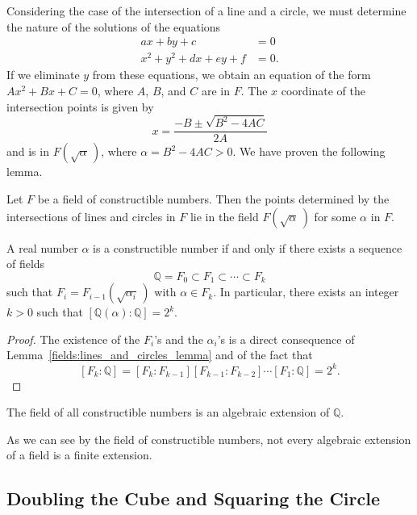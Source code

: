 Considering the case of the intersection of a line and a circle, we
must determine the nature of the solutions of the equations
\begin{align*}
a x + by + c & = 0 \\
x^2 + y^2 + d x + e y + f & = 0.
\end{align*}
If we eliminate $y$ from these equations, we obtain an equation of
the form $Ax^2 + B x + C = 0$, where $A$, $B$, and $C$ are in $F$. The
$x$ coordinate of the intersection points is given by
\[
x = \frac{- B \pm \sqrt{B^2 - 4 A C} }{2 A}
\]
and is in $F( \sqrt{\alpha}\, )$, where $\alpha = B^2 - 4 A C > 0$.
We have proven the following lemma.

 
\begin{lemma}\label{fields:lines_and_circles_lemma}
Let $F$ be a field of constructible numbers. Then the points
determined by the intersections of lines and circles in $F$ lie in the
field $F( \sqrt{\alpha}\, )$ for some $\alpha$ in $F$.  
\end{lemma}
 
 
\begin{theorem}
A real number $\alpha$ is a constructible number if and only if there
exists a  sequence of fields
\[
{\mathbb Q} = F_0 \subset F_1 \subset \cdots \subset F_k
\]
such that $F_i = F_{i-1}( \sqrt{ \alpha_i}\, )$ with $\alpha \in F_k$. 
In particular, there exists an integer $k > 0$ such that 
$[{\mathbb Q}(\alpha) : {\mathbb Q} ] = 2^k$.
\end{theorem}
 
 
\begin{proof}
The existence of the $F_i$'s and the $\alpha_i$'s is a direct
consequence of Lemma~\ref{fields:lines_and_circles_lemma} and of the fact that
\[
[F_k: {\mathbb Q}] = [F_k : F_{k-1}][F_{k-1} : F_{k-2}] \cdots [F_1:
{\mathbb Q} ] = 2^k.
\]
\end{proof}


\begin{corollary}
The field of all constructible numbers is an algebraic extension of
${\mathbb Q}$.
\end{corollary}
 

As we can see by the field of constructible numbers, not every
algebraic extension of a field is a finite extension. 
 


\subsection*{Doubling the Cube and Squaring the Circle}
 

